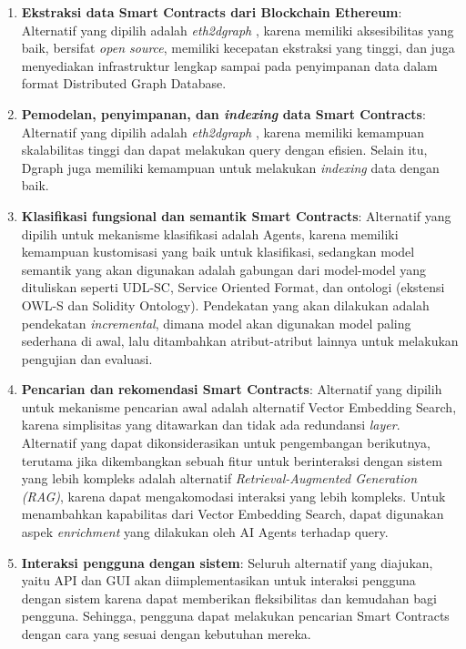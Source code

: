 \begin{enumerate}
    \item \textbf{Ekstraksi data Smart Contracts dari Blockchain Ethereum}: Alternatif yang dipilih adalah \textit{eth2dgraph} \parencite{aimar2023extraction}, karena memiliki aksesibilitas yang baik, bersifat \textit{open source}, memiliki kecepatan ekstraksi yang tinggi, dan juga menyediakan infrastruktur lengkap sampai pada penyimpanan data dalam format Distributed Graph Database.
    \item \textbf{Pemodelan, penyimpanan, dan \textit{indexing} data Smart Contracts}: Alternatif yang dipilih adalah \textit{eth2dgraph} \parencite{aimar2023extraction}, karena memiliki kemampuan skalabilitas tinggi dan dapat melakukan query dengan efisien. Selain itu, Dgraph juga memiliki kemampuan untuk melakukan \textit{indexing} data dengan baik.
    \item \textbf{Klasifikasi fungsional dan semantik Smart Contracts}: Alternatif yang dipilih untuk mekanisme klasifikasi adalah Agents, karena memiliki kemampuan kustomisasi yang baik untuk klasifikasi, sedangkan model semantik yang akan digunakan adalah gabungan dari model-model yang dituliskan seperti UDL-SC, Service Oriented Format, dan ontologi (ekstensi OWL-S dan Solidity Ontology). Pendekatan yang akan dilakukan adalah pendekatan \textit{incremental}, dimana model akan digunakan model paling sederhana di awal, lalu ditambahkan atribut-atribut lainnya untuk melakukan pengujian dan evaluasi.
    \item \textbf{Pencarian dan rekomendasi Smart Contracts}: Alternatif yang dipilih untuk mekanisme pencarian awal adalah alternatif Vector Embedding Search, karena simplisitas yang ditawarkan dan tidak ada redundansi \textit{layer}. Alternatif yang dapat dikonsiderasikan untuk pengembangan berikutnya, terutama jika dikembangkan sebuah fitur untuk berinteraksi dengan sistem yang lebih kompleks adalah alternatif \textit{Retrieval-Augmented Generation (RAG)}, karena dapat mengakomodasi interaksi yang lebih kompleks. Untuk menambahkan kapabilitas dari Vector Embedding Search, dapat digunakan aspek \textit{enrichment} yang dilakukan oleh AI Agents terhadap query.
    \item \textbf{Interaksi pengguna dengan sistem}: Seluruh alternatif yang diajukan, yaitu API dan GUI akan diimplementasikan untuk interaksi pengguna dengan sistem karena dapat memberikan fleksibilitas dan kemudahan bagi pengguna. Sehingga, pengguna dapat melakukan pencarian Smart Contracts dengan cara yang sesuai dengan kebutuhan mereka.
\end{enumerate}